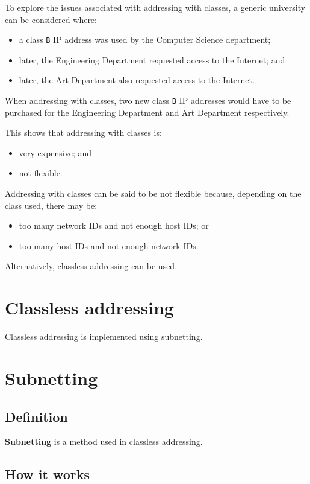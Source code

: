 \documentclass[a4paper]{systems-software}
\begin{document}
To explore the issues associated with addressing with classes, a generic university can be considered where:
\begin{itemize}
	\item a class \texttt{B} IP address was used by the Computer Science department;
	\item later, the Engineering Department requested access to the Internet; and
	\item later, the Art Department also requested access to the Internet.
\end{itemize}

When addressing with classes, two new class \texttt{B} IP addresses would have to be purchased for the Engineering Department and Art Department respectively.

This shows that addressing with classes is:
\begin{itemize}
	\item very expensive; and
	\item not flexible.
\end{itemize}

Addressing with classes can be said to be not flexible because, depending on the class used, there may be:
\begin{itemize}
	\item too many network IDs and not enough host IDs; or
	\item too many host IDs and not enough network IDs. 
\end{itemize}

Alternatively, classless addressing can be used.


\section{Classless addressing}

Classless addressing is implemented using subnetting.


\section*{Subnetting}

\subsection*{Definition}

\textbf{Subnetting} is a method used in classless addressing.


\subsection*{How it works}
\end{document}
